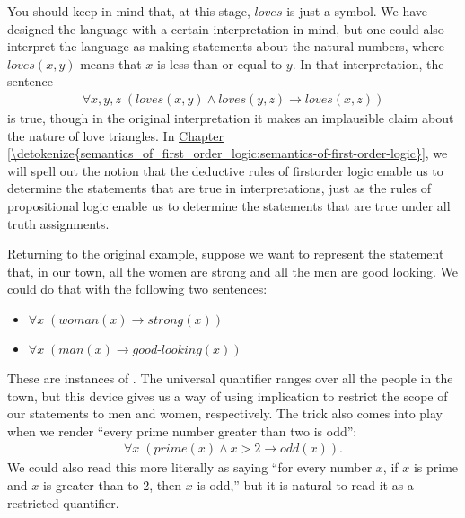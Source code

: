 \documentclass[letterpaper,10pt,english]{sphinxmanual}
\begin{document}
\sphinxAtStartPar
You should keep in mind that, at this stage, \(\mathit{loves}\) is just a symbol. We have designed the language with a certain interpretation in mind, but one could also interpret the language as making statements about the natural numbers, where \(\mathit{loves}(x, y)\) means that \(x\) is less than or equal to \(y\). In that interpretation, the sentence
\begin{equation*}
\begin{split}\forall {x, y, z} \; (\mathit{loves}(x, y) \wedge \mathit{loves}(y, z) \to \mathit{loves}(x, z))\end{split}
\end{equation*}
\sphinxAtStartPar
is true, though in the original interpretation it makes an implausible claim about the nature of love triangles. In \hyperref[\detokenize{semantics_of_first_order_logic:semantics-of-first-order-logic}]{Chapter \ref{\detokenize{semantics_of_first_order_logic:semantics-of-first-order-logic}}}, we will spell out the notion that the deductive rules of first\sphinxhyphen{}order logic enable us to determine the statements that are true in  interpretations, just as the rules of propositional logic enable us to determine the statements that are true under all truth assignments.

\sphinxAtStartPar
Returning to the original example, suppose we want to represent the statement that, in our town, all the women are strong and all the men are good looking. We could do that with the following two sentences:
\begin{itemize}
\item {} 
\sphinxAtStartPar
\(\forall x \; (\mathit{woman}(x) \to \mathit{strong}(x))\)

\item {} 
\sphinxAtStartPar
\(\forall x \; (\mathit{man}(x) \to \mathit{good{\mathord{\mbox{-}}}looking}(x))\)

\end{itemize}

\sphinxAtStartPar
These are instances of . The universal quantifier ranges over all the people in the town, but this device gives us a way of using implication to restrict the scope of our statements to men and women, respectively. The trick also comes into play when we render “every prime number greater than two is odd”:
\begin{equation*}
\begin{split}\forall x \; (\mathit{prime}(x) \wedge x > 2 \to \mathit{odd}(x)).\end{split}
\end{equation*}
\sphinxAtStartPar
We could also read this more literally as saying “for every number \(x\), if \(x\) is prime and \(x\) is greater than to 2, then \(x\) is odd,” but it is natural to read it as a restricted quantifier.
\end{document}
